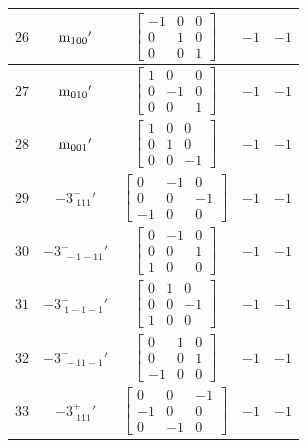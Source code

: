 \documentclass[fleqn,8pt]{jsarticle}
\begin{document}
\begin{longtable}{ccccc}
$ 26 $ & $ {\rm m}_{100}{}' $ & $ \begin{bmatrix} -1 & 0 & 0 \\ 0 & 1 & 0 \\ 0 & 0 & 1 \end{bmatrix} $ & $ -1 $ & $ -1 $ \\ \hline
$ 27 $ & $ {\rm m}_{010}{}' $ & $ \begin{bmatrix} 1 & 0 & 0 \\ 0 & -1 & 0 \\ 0 & 0 & 1 \end{bmatrix} $ & $ -1 $ & $ -1 $ \\ \hline
$ 28 $ & $ {\rm m}_{001}{}' $ & $ \begin{bmatrix} 1 & 0 & 0 \\ 0 & 1 & 0 \\ 0 & 0 & -1 \end{bmatrix} $ & $ -1 $ & $ -1 $ \\ \hline
$ 29 $ & $ -3^{-}_{\,\,111}{}' $ & $ \begin{bmatrix} 0 & -1 & 0 \\ 0 & 0 & -1 \\ -1 & 0 & 0 \end{bmatrix} $ & $ -1 $ & $ -1 $ \\ \hline
$ 30 $ & $ -3^{-}_{\,\,-1-11}{}' $ & $ \begin{bmatrix} 0 & -1 & 0 \\ 0 & 0 & 1 \\ 1 & 0 & 0 \end{bmatrix} $ & $ -1 $ & $ -1 $ \\ \hline
$ 31 $ & $ -3^{-}_{\,\,1-1-1}{}' $ & $ \begin{bmatrix} 0 & 1 & 0 \\ 0 & 0 & -1 \\ 1 & 0 & 0 \end{bmatrix} $ & $ -1 $ & $ -1 $ \\ \hline
$ 32 $ & $ -3^{-}_{\,\,-11-1}{}' $ & $ \begin{bmatrix} 0 & 1 & 0 \\ 0 & 0 & 1 \\ -1 & 0 & 0 \end{bmatrix} $ & $ -1 $ & $ -1 $ \\ \hline
$ 33 $ & $ -3^{+}_{\,\,111}{}' $ & $ \begin{bmatrix} 0 & 0 & -1 \\ -1 & 0 & 0 \\ 0 & -1 & 0 \end{bmatrix} $ & $ -1 $ & $ -1 $ \\ \hline

\end{longtable}
\end{document}
